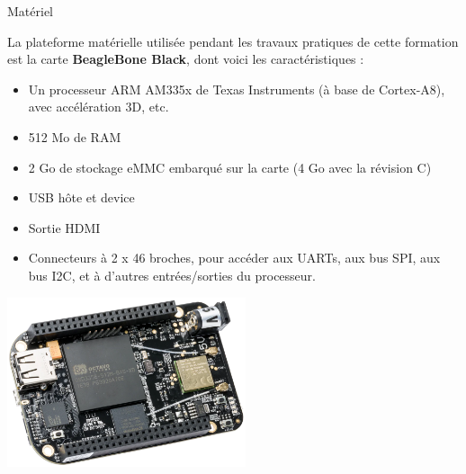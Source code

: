 \documentclass[a4paper,12pt,obeyspaces,spaces,hyphens]{article}
\begin{document}
\feshowtitle

\certificate{}
\disabilities{}

\feagendatwocolumn
{Matériel}
{
  La plateforme matérielle utilisée pendant les travaux pratiques de
  cette formation est la carte {\bf BeagleBone Black}, dont voici les
  caractéristiques :

  \begin{itemize}
  \item Un processeur ARM AM335x de Texas Instruments (à base de
    Cortex-A8), avec accélération 3D, etc.
  \item 512 Mo de RAM
  \item 2 Go de stockage eMMC embarqué sur la carte
	\newline(4 Go avec la révision C)
  \item USB hôte et device
  \item Sortie HDMI
  \item Connecteurs à 2 x 46 broches, pour accéder aux UARTs, aux
        bus SPI, aux bus I2C, et à d'autres entrées/sorties du
        processeur.
  \end{itemize}
}
{}
{
  \begin{center}
    \includegraphics[height=5cm]{../slides/beagleboneblack-board/beagleboneblack.png}
  \end{center}
}
\end{document}
